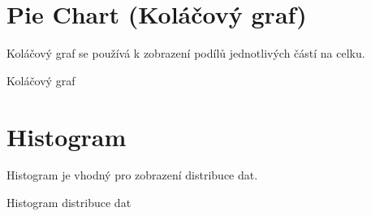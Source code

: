 \section{Pie Chart (Koláčový graf)}

Koláčový graf se používá k zobrazení podílů jednotlivých částí na celku.

\begin{chart}[H]
    \centering
    \caption{Koláčový graf}
    \label{chart:pie}
\end{chart}

\section{Histogram}

Histogram je vhodný pro zobrazení distribuce dat.

\begin{chart}[H]
    \centering
    \caption{Histogram distribuce dat}
    \label{chart:histogram}
\end{chart}
